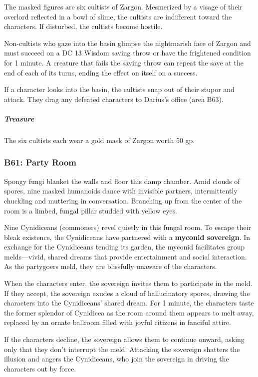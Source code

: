 \documentclass[10pt,a4paper,twoside,bg=print,twocolumn,openany,nodeprecatedcode]{dndbook}
\begin{document}
The masked figures are six cultists of Zargon. Mesmerized by a visage of their overlord reflected in a bowl of slime, the cultists are indifferent toward the characters. If disturbed, the cultists become hostile.

Non-cultists who gaze into the basin glimpse the nightmarish face of Zargon and must succeed on a DC 13 Wisdom saving throw or have the frightened condition for 1 minute. A creature that fails the saving throw can repeat the save at the end of each of its turns, ending the effect on itself on a success.

If a character looks into the basin, the cultists snap out of their stupor and attack. They drag any defeated characters to Darius's office (area B63).

\subparagraph{Treasure}
The six cultists each wear a gold mask of Zargon worth 50 gp.

\subsubsection{B61: Party Room}
\begin{DndReadAloud}{}
Spongy fungi blanket the walls and floor this damp chamber. Amid clouds of spores, nine masked humanoids dance with invisible partners, intermittently chuckling and muttering in conversation. Branching up from the center of the room is a limbed, fungal pillar studded with yellow eyes.

\end{DndReadAloud}

Nine Cynidiceans (commoners) revel quietly in this fungal room. To escape their bleak existence, the Cynidiceans have partnered with a \textbf{myconid sovereign}. In exchange for the Cynidiceans tending its garden, the myconid facilitates group melds—vivid, shared dreams that provide entertainment and social interaction. As the partygoers meld, they are blissfully unaware of the characters.

When the characters enter, the sovereign invites them to participate in the meld. If they accept, the sovereign exudes a cloud of hallucinatory spores, drawing the characters into the Cynidiceans' shared dream. For 1 minute, the characters taste the former splendor of Cynidicea as the room around them appears to melt away, replaced by an ornate ballroom filled with joyful citizens in fanciful attire.

If the characters decline, the sovereign allows them to continue onward, asking only that they don't interrupt the meld. Attacking the sovereign shatters the illusion and angers the Cynidiceans, who join the sovereign in driving the characters out by force.
\end{document}
